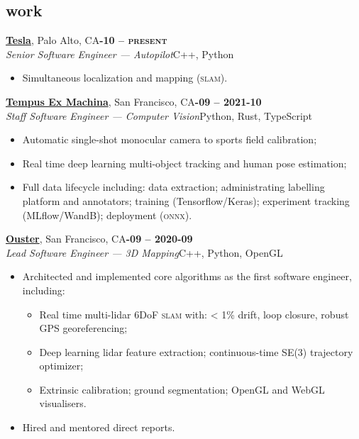 \documentclass[margin,10pt]{res}
\begin{document}
\begin{resume}
\section{\sc \lsstyle work}
    \href{https://tesla.com}{\textbf{Tesla}}, Palo Alto, CA\hfill \textsc{\bfseries{}-10 -- present}\\
    \textit{Senior Software Engineer --- Autopilot}\hfill C++, Python
    \vspace{0.5em}
    \begin{itemize}
        \item Simultaneous localization and mapping (\textsc{slam}).
    \end{itemize}

    \href{https://tempus-ex.com}{\textbf{Tempus Ex Machina}}, San Francisco, CA\hfill \textsc{\bfseries{}-09 -- 2021-10}\\
    \textit{Staff Software Engineer --- Computer Vision}\hfill Python, Rust, TypeScript
    \vspace{0.5em}
    \begin{itemize}
        \item Automatic single-shot monocular camera to sports field calibration;
        \item Real time deep learning multi-object tracking and human pose estimation;
        \item Full data lifecycle including: data extraction; administrating labelling platform and annotators; training (Tensorflow/Keras); experiment tracking (MLflow/WandB); deployment (\textsc{onnx}).
    \end{itemize}

    \href{https://ouster.io}{\textbf{Ouster}}, San Francisco, CA\hfill \textsc{\bfseries{}-09 -- 2020-09}\\
    \textit{Lead Software Engineer --- 3D Mapping}\hfill C++, Python, OpenGL
    \vspace{0.5em}
    \begin{itemize}
        \item Architected and implemented core algorithms as the first software engineer, including:
        \begin{itemize}
            \item Real time multi-lidar 6DoF \textsc{slam} with: < 1\% drift, loop closure, robust GPS georeferencing;
            \item Deep learning lidar feature extraction; continuous-time SE(3) trajectory optimizer;
            \item Extrinsic calibration; ground segmentation; OpenGL and WebGL visualisers.
        \end{itemize}
        \item Hired and mentored direct reports.
    \end{itemize}

\end{resume}
\end{document}
